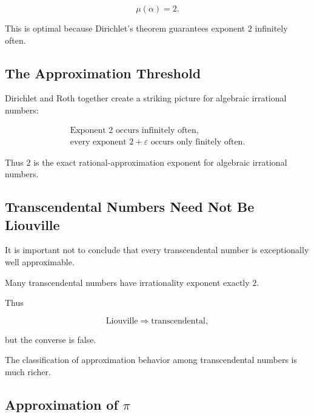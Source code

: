 \[ \boxed{\mu(\alpha)=2.} \]

This is optimal because Dirichlet's theorem guarantees exponent \(2\)
infinitely often.

\subsection{The Approximation Threshold}
\label{subsec:approximation-threshold}

Dirichlet and Roth together create a striking picture for algebraic
irrational numbers:

\[
\boxed{
\begin{array}{c}
\text{Exponent }2\text{ occurs infinitely often},\\[1mm]
\text{every exponent }2+\varepsilon\text{ occurs only finitely often}.
\end{array}
}
\]

Thus \(2\) is the exact rational-approximation exponent for algebraic
irrational numbers.

\subsection{Transcendental Numbers Need Not Be Liouville}
\label{subsec:transcendental-not-liouville}

It is important not to conclude that every transcendental number is
exceptionally well approximable.

Many transcendental numbers have irrationality exponent exactly \(2\).

Thus

\[
\text{Liouville}
\Longrightarrow
\text{transcendental},
\]

but the converse is false.

The classification of approximation behavior among transcendental numbers
is much richer.

\subsection{Approximation of \(\pi\)}
\label{subsec:pi-rational-approximation}

